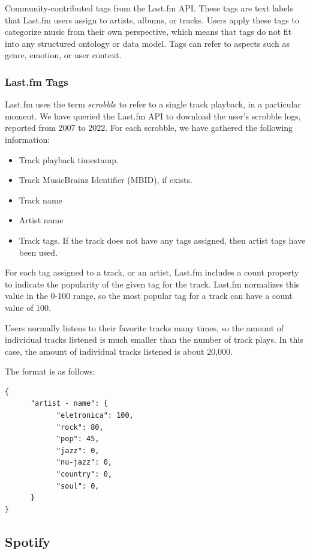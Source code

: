\documentclass[sn-mathphys]{sn-jnl}%
\theoremstyle{thmstyleone}%
\theoremstyle{thmstyletwo}%
\theoremstyle{thmstylethree}%
\begin{document}
Community-contributed tags from the Last.fm API.
These tags are text labels that Last.fm users assign
to artists, albums, or tracks. Users apply these tags to
categorize music from their own perspective, which
means that tags do not fit into any structured ontology
or data model. Tags can refer to aspects such as genre,
emotion, or user context.

\subsubsection{Last.fm Tags}
Last.fm uses the term \emph{scrobble} to refer to a single track playback,
in a particular moment. We have queried the Last.fm
API to download the user{'}s scrobble logs, reported from 2007 to 2022.
For each scrobble, we have gathered the following information:

\begin{itemize}
     \item Track playback timestamp.
     \item Track MusicBrainz Identifier (MBID), if exists.
     \item Track name
     \item Artist name
     \item Track tags. If the track does not have any tags assigned,
      then artist tags have been used.
\end{itemize}


For each tag assigned to a track, or an artist, Last.fm includes
a count property to indicate the popularity of the given tag for the track.
Last.fm normalizes this value in the 0-100 range, so the most popular tag for a track can have a
count value of 100.

Users normally listens to their favorite tracks many times,
so the amount of individual tracks listened is much smaller
than the number of track plays. In this case, the amount of
individual tracks listened is about 20,000.

The format is as follows:

\begin{verbatim}
{
      "artist - name": {
            "eletronica": 100,
            "rock": 80,
            "pop": 45,
            "jazz": 0,
            "nu-jazz": 0,
            "country": 0,
            "soul": 0,
      }
}
\end{verbatim}


\subsection{Spotify}
\end{document}
